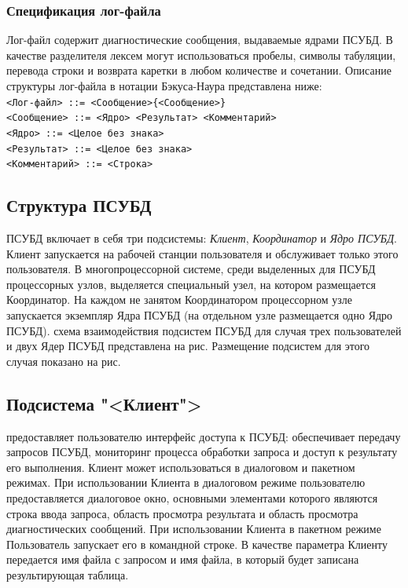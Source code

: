 \documentclass[11pt,oneside]{article}
\begin{document}
\subsubsection{Спецификация лог-файла}\label{S_LOG}
Лог-файл содержит диагностические сообщения, выдаваемые ядрами ПСУБД.
В качестве разделителя лексем могут использоваться пробелы, символы табуляции, перевода строки и возврата каретки в любом количестве и сочетании. Описание структуры лог-файла в нотации Бэкуса-Наура представлена ниже:\\
\texttt{<Лог-файл> ::= <Сообщение>\{<Сообщение>\}\\
<Сообщение> ::= <Ядро> <Результат> <Комментарий>\\
<Ядро> ::= <Целое без знака>\\
<Результат> ::= <Целое без знака>\\
<Комментарий> ::= <Строка>
}

\subsection{Структура ПСУБД}\label{S_PDBMSStructure}
ПСУБД включает в себя три подсистемы: \textit{Клиент}, \textit{Координатор} и \textit{Ядро ПСУБД}. Клиент запускается на рабочей станции пользователя и обслуживает только этого пользователя. В многопроцессорной системе, среди выделенных для ПСУБД процессорных узлов, выделяется специальный узел, на котором размещается Координатор. На каждом не занятом Координатором процессорном узле запускается экземпляр Ядра ПСУБД (на отдельном узле размещается одно Ядро ПСУБД).
 схема взаимодействия подсистем ПСУБД для случая трех пользователей и двух Ядер ПСУБД представлена на рис. %
Размещение подсистем для этого случая показано на рис.%


\subsection{Подсистема "<Клиент">}\label{S_Client}
 предоставляет пользователю интерфейс доступа к ПСУБД: обеспечивает передачу запросов ПСУБД, мониторинг процесса обработки запроса и доступ к результату его выполнения. Клиент может использоваться в диалоговом и пакетном режимах. При использовании Клиента в диалоговом режиме пользователю предоставляется диалоговое окно, основными элементами которого являются строка ввода запроса, область просмотра результата и область просмотра диагностических сообщений. При использовании Клиента в пакетном режиме Пользователь запускает его в командной строке. В качестве параметра Клиенту передается имя файла с запросом и имя файла, в который будет записана результирующая таблица.
\end{document}
